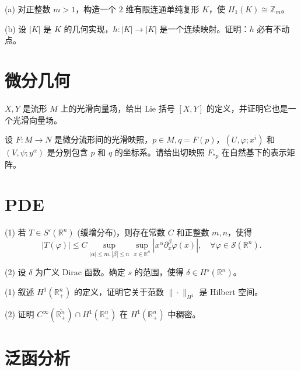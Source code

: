 \begin{problem}
(a) 对正整数 \(m > 1\)，构造一个 $2$ 维有限连通单纯复形 \(K\)，使 \(H_{1}(K) \cong \mathbb{Z}_{m}\)。

(b) 设 \(|K|\) 是 \(K\) 的几何实现，\(h: |K| \to |K|\) 是一个连续映射。证明：\(h\) 必有不动点。
\end{problem}

\section{微分几何}

\begin{problem}
\(X, Y\) 是流形 \(M\) 上的光滑向量场，给出 Lie 括号 \([X,Y]\) 的定义，并证明它也是一个光滑向量场。
\end{problem}

\begin{problem}
设 \(F : M \to N\) 是微分流形间的光滑映照，\(p \in M, q = F(p)\)，\((U, \varphi; x^{i})\) 和 \((V, \psi; y^{\alpha})\) 是分别包含 \(p\) 和 \(q\) 的坐标系。请给出切映照 \(F_{*p}\) 在自然基下的表示矩阵。
\end{problem}

\section{PDE}

\begin{problem}
(1) 若 \( T \in S'(\mathbb{R}^n) \) (缓增分布)，则存在常数 \( C \) 和正整数 \( m, n \)，使得
\[
|T(\varphi)| \leq C \sup_{|\alpha| \leq m, |\beta| \leq n} \sup_{x \in \mathbb{R}^n} |x^\alpha \partial_x^\beta \varphi(x)|, \quad \forall \varphi \in \mathcal{S}(\mathbb{R}^n).
\]

(2) 设 \(\delta\) 为广义 Dirac 函数。确定 \( s \) 的范围，使得 \(\delta \in H^s(\mathbb{R}^n)\)。
\end{problem}

\begin{problem}
(1) 叙述 \( H^1(\mathbb{R}^n_+) \) 的定义，证明它关于范数 \( \| \cdot \|_{H^1} \) 是 Hilbert 空间。

(2) 证明 \( C^\infty(\overline{\mathbb{R}^n_+}) \cap H^1(\mathbb{R}^n_+) \) 在 \( H^1(\mathbb{R}^n_+) \) 中稠密。
\end{problem}

\section{泛函分析}

